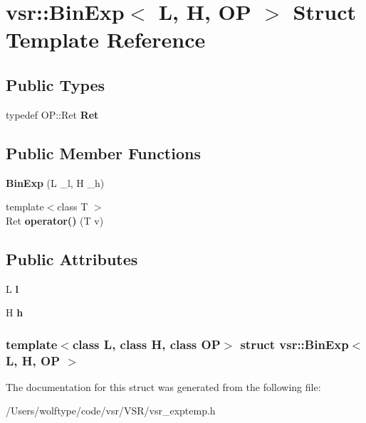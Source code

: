 \hypertarget{structvsr_1_1_bin_exp}{\section{vsr\-:\-:Bin\-Exp$<$ L, H, O\-P $>$ Struct Template Reference}
\label{structvsr_1_1_bin_exp}
}
\subsection*{Public Types}
\begin{DoxyCompactItemize}
\item 
\hypertarget{structvsr_1_1_bin_exp_ae443405739718988bf789453a4e5f200}{typedef O\-P\-::\-Ret {\bfseries Ret}}\label{structvsr_1_1_bin_exp_ae443405739718988bf789453a4e5f200}

\end{DoxyCompactItemize}
\subsection*{Public Member Functions}
\begin{DoxyCompactItemize}
\item 
\hypertarget{structvsr_1_1_bin_exp_a671bb3111913b852a48109b6c2a3c6a1}{{\bfseries Bin\-Exp} (L \-\_\-l, H \-\_\-h)}\label{structvsr_1_1_bin_exp_a671bb3111913b852a48109b6c2a3c6a1}

\item 
\hypertarget{structvsr_1_1_bin_exp_a4dbf8b5f2dddcff19e477e331deda885}{{\footnotesize template$<$class T $>$ }\\Ret {\bfseries operator()} (T v)}\label{structvsr_1_1_bin_exp_a4dbf8b5f2dddcff19e477e331deda885}

\end{DoxyCompactItemize}
\subsection*{Public Attributes}
\begin{DoxyCompactItemize}
\item 
\hypertarget{structvsr_1_1_bin_exp_af501efef05314b5d7e1eabd572b0ecd7}{L {\bfseries l}}\label{structvsr_1_1_bin_exp_af501efef05314b5d7e1eabd572b0ecd7}

\item 
\hypertarget{structvsr_1_1_bin_exp_a86311447517a6881e83bb1832d8c435b}{H {\bfseries h}}\label{structvsr_1_1_bin_exp_a86311447517a6881e83bb1832d8c435b}

\end{DoxyCompactItemize}
\subsubsection*{template$<$class L, class H, class O\-P$>$ struct vsr\-::\-Bin\-Exp$<$ L, H, O\-P $>$}



The documentation for this struct was generated from the following file\-:\begin{DoxyCompactItemize}
\item 
/\-Users/wolftype/code/vsr/\-V\-S\-R/vsr\-\_\-exptemp.\-h\end{DoxyCompactItemize}
